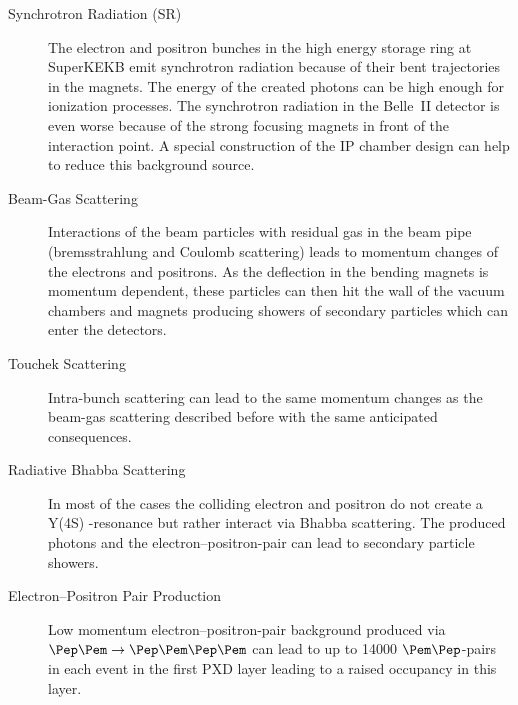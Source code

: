 \begin{description}
 \item[Synchrotron Radiation (SR)] The electron and positron bunches in the high energy storage ring at SuperKEKB emit synchrotron radiation because of their bent trajectories in the magnets. The energy of the created photons can be high enough for ionization processes. The synchrotron radiation in the Belle~II detector is even worse because of the strong focusing magnets in front of the interaction point. A special construction of the IP chamber design can help to reduce this background source.
 \item[Beam-Gas Scattering] Interactions of the beam particles with residual gas in the beam pipe (bremsstrahlung and Coulomb scattering) leads to momentum changes of the electrons and positrons. As the deflection in the bending magnets is momentum dependent, these particles can then hit the wall of the vacuum chambers and magnets producing showers of secondary particles which can enter the detectors.
 \item[Touchek Scattering] Intra-bunch scattering can lead to the same momentum changes as the beam-gas scattering described before with the same anticipated consequences.
 \item[Radiative Bhabba Scattering] In most of the cases the colliding electron and positron do not create a Y(4S) -resonance but rather interact via Bhabba scattering. The produced photons and the electron--positron-pair can lead to secondary particle showers.
 \item[Electron--Positron Pair Production] Low momentum electron--positron-pair background produced via $\Pep \Pem \to \Pep \Pem \Pep \Pem$ can lead to up to 14000 $\Pem\Pep$-pairs in each event in the first PXD layer leading to a raised occupancy in this layer.
\end{description}
